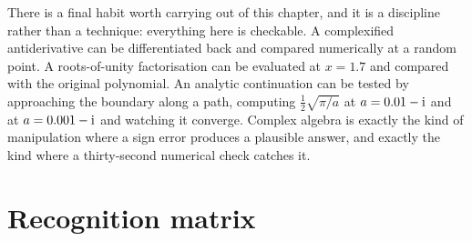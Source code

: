 There is a final habit worth carrying out of this chapter, and it is a discipline rather than a technique: everything here is checkable. A complexified antiderivative can be differentiated back and compared numerically at a random point. A roots-of-unity factorisation can be evaluated at $x=1.7$ and compared with the original polynomial. An analytic continuation can be tested by approaching the boundary along a path, computing $\tfrac12\sqrt{\pi/a}$ at $a=0.01-\mathrm{i}$ and at $a=0.001-\mathrm{i}$ and watching it converge. Complex algebra is exactly the kind of manipulation where a sign error produces a plausible answer, and exactly the kind where a thirty-second numerical check catches it.

\section{Recognition matrix}
